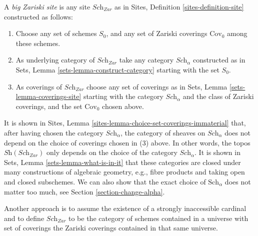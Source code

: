 \begin{definition}
\label{definition-big-zariski-site}
A {\it big Zariski site} is any site $\textit{Sch}_{Zar}$ as in
Sites, Definition \ref{sites-definition-site} constructed as follows:
\begin{enumerate}
\item Choose any set of schemes $S_0$, and any set of Zariski coverings
$\text{Cov}_0$ among these schemes.
\item As underlying category of $\textit{Sch}_{Zar}$
take any category $\textit{Sch}_\alpha$ constructed as in
Sets, Lemma \ref{sets-lemma-construct-category} starting with the set $S_0$.
\item As coverings of $\textit{Sch}_{Zar}$ choose any set of coverings as in
Sets, Lemma \ref{sets-lemma-coverings-site} starting with the
category $\textit{Sch}_\alpha$ and the class of Zariski coverings,
and the set $\text{Cov}_0$ chosen above.
\end{enumerate}
\end{definition}

\noindent
It is shown in Sites, Lemma \ref{sites-lemma-choice-set-coverings-immaterial}
that, after having chosen the category $\textit{Sch}_\alpha$, the
category of sheaves on $\textit{Sch}_\alpha$ does not depend on the
choice of coverings chosen in (3) above. In other words, the topos
$\textit{Sh}(\textit{Sch}_{Zar})$ only depends on the choice of
the category $\textit{Sch}_\alpha$. It is shown in
Sets, Lemma \ref{sets-lemma-what-is-in-it} that these categories
are closed under many constructions of algebraic geometry, e.g.,
fibre products and taking open and closed subschemes. We can also show
that the exact choice of $\text{Sch}_\alpha$ does not matter
too much, see Section \ref{section-change-alpha}.

\medskip\noindent
Another approach is to assume the existence of a
strongly inaccessible cardinal and to define $\textit{Sch}_{Zar}$
to be the category of schemes contained in a universe with
set of coverings the Zariski coverings contained in that same
universe.

